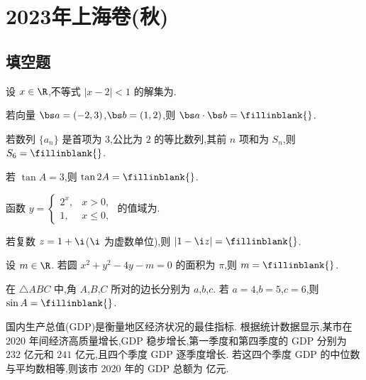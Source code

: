 ﻿\chapter{2023年上海卷(秋)}

\section{填空题}

\begin{problem}
设 \(x\in\R\),不等式 \(\left|x-2\right|<1\) 的解集为\fillinblank{}.
\end{problem}

\begin{problem}
若向量 \(\bs a=\left(-2,3\right)\),\(\bs b=\left(1,2\right)\),则 \(\bs a\cdot\bs b=\fillinblank{}\).
\end{problem}

\begin{problem}
若数列 \(\{a_n\}\) 是首项为 \(3\),公比为 \(2\) 的等比数列,其前 \(n\) 项和为 \(S_n\),则 \(S_6=\fillinblank{}\).
\end{problem}

\begin{problem}
若 \(\tan A=3\),则 \(\tan 2A=\fillinblank{}\).
\end{problem}

\begin{problem}
函数 \(y=\begin{cases}
2^x,&x>0,\\
1,&x\le 0,
\end{cases}\) 的值域为\fillinblank{}.
\end{problem}

\begin{problem}
若复数 \(z=1+\i\)(\(\i\) 为虚数单位),则 \(\left|1-\i z\right|=\fillinblank{}\).
\end{problem}

\begin{problem}
设 \(m\in\R\). 若圆 \(x^2+y^2-4y-m=0\) 的面积为 \(\pi\),则 \(m=\fillinblank{}\).
\end{problem}

\begin{problem}
在 \(\triangle ABC\) 中,角 \(A\),\(B\),\(C\) 所对的边长分别为 \(a\),\(b\),\(c\). 若 \(a=4\),\(b=5\),\(c=6\),则 \(\sin A=\fillinblank{}\).
\end{problem}

\begin{problem}
国内生产总值(GDP)是衡量地区经济状况的最佳指标. 根据统计数据显示,某市在 2020 年间经济高质量增长,GDP 稳步增长,第一季度和第四季度的 GDP 分别为 \(232\) 亿元和 \(241\) 亿元,且四个季度 GDP 逐季度增长. 若这四个季度 GDP 的中位数与平均数相等,则该市 2020 年的 GDP 总额为\fillinblank{} 亿元.
\end{problem}

